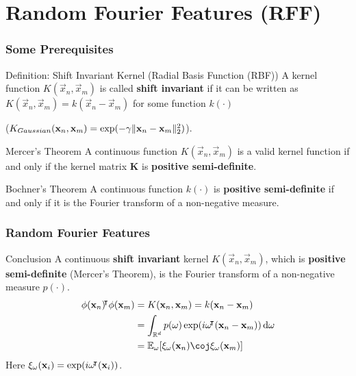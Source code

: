\documentclass[10pt]{../formats/RU}
\begin{document}
\section{Random Fourier Features (RFF)}
\begin{frame}
\frametitle{Some Prerequisites}
\begin{block}{Definition: Shift Invariant Kernel (Radial Basis Function (RBF))}
  A kernel function $K(\vec{x}_n, \vec{x}_m)$ is called \textbf{shift invariant} if it can be written as $K(\vec{x}_n, \vec{x}_m) = k(\vec{x}_n-\vec{x}_m)$ for some function $k(\cdot)$

  (\eg $K_{Gaussian}(\mathbf{x}_n,\mathbf{x}_m)=\exp(-\gamma\lVert\mathbf{x}_n-\mathbf{x}_m\rVert_2^2)$).
\end{block}
\begin{alertblock}{Mercer’s Theorem}
  A continuous function $K(\vec{x}_n, \vec{x}_m)$ is a valid kernel function if and only if the kernel matrix $\mathbf{K}$ is \textbf{positive semi-definite}.
\end{alertblock}
\begin{alertblock}{Bochner's Theorem}
  A continuous function $k(\cdot)$ is \textbf{positive semi-definite} if and only if it is the Fourier transform of a non-negative measure.
\end{alertblock}
\end{frame}
\begin{frame}
  \frametitle{Random Fourier Features}
  \begin{exampleblock}{Conclusion}
    A continuous \textbf{shift invariant} kernel $K(\vec{x}_n, \vec{x}_m)$, which is \textbf{positive semi-definite} (Mercer's Theorem), is the Fourier transform of a non-negative measure $p(\cdot)$.
    \begin{align}
      \phi(\vec{x}_n)\trn\phi(\vec{x}_m)
      &= K(\vec{x}_n, \vec{x}_m) = k(\vec{x}_n-\vec{x}_m) \\
      &=\int_{\R^d}p(\vec{\omega})\exp(i\vec{\omega}\trn(\vec{x}_n-\vec{x}_m))\diff\vec{\omega} \\
      &= \mathbb{E}_{\vec{\omega}}\bracks*{\xi_{\vec{\omega}}(\vec{x}_n)\coj\xi_{\vec{\omega}}(\vec{x}_m)}\label{rffinC}
    \end{align}
    Here
    $
    \xi_{\mathbf{\omega}}(\mathbf{x}_i)=\exp(i\mathbf{\omega}{}^{\mkern-4mu\intercal}(\mathbf{x}_i))
    $.
  \end{exampleblock}
\end{frame}
\end{document}
